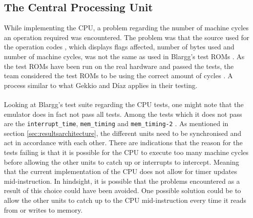 \subsection{The Central Processing Unit}
\label{sec:CPUDiscussion}
While implementing the CPU, a problem regarding the number of machine cycles an operation required was encountered. The problem was that the source used for the operation codes \cite{OpCodes}, which displays flags affected, number of bytes used and number of machine cycles, was not the same as used in Blargg's test ROMs \cite{Blargg}. As the test ROMs have been run on the real hardware and passed the tests, the team considered the test ROMs to be using the correct amount of cycles \cite{TestROMsResult}. A process similar to what Gekkio and Díaz applies in their testing.
\\\\
Looking at Blargg's test suite regarding the CPU tests, one might note that the emulator does in fact not pass all tests. Among the tests which it does not pass are the \texttt{interrupt\_time}, \texttt{mem\_timing} and \texttt{mem\_timing-2} \cite{Blargg}. As mentioned in section \ref{sec:resultsarchitecture}, the different units need to be synchronised and act in accordance with each other. There are indications that the reason for the tests failing is that it is possible for the CPU to execute too many machine cycles before allowing the other units to catch up or interrupts to intercept. Meaning that the current implementation of the CPU does not allow for timer updates mid-instruction. In hindsight, it is possible that the problems encountered as a result of this choice could have been avoided. One possible solution could be to allow the other units to catch up to the CPU mid-instruction every time it reads from or writes to memory.
\\

